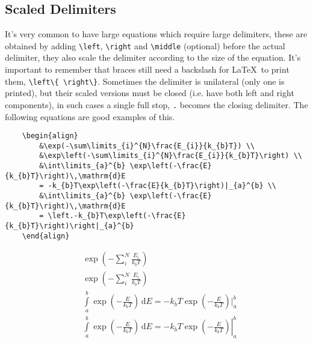 \subsection{Scaled Delimiters}
%
It's very common to have large equations which require large delimiters, these are obtained by adding \verb|\left|, \verb|\right| and \verb|\middle| (optional) before the actual delimiter, they also scale the delimiter according to the size of the equation. It's important to remember that braces still need a backslash for \LaTeX~to print them, \verb|\left\{ \right\}|. Sometimes the delimiter is unilateral (only one is printed), but their scaled versions must be closed (i.e. have both left and right components), in such cases a single full stop, \verb|.| becomes the closing delimiter. The following equations are good examples of this.
\begin{verbatim}
	\begin{align}
	    &\exp(-\sum\limits_{i}^{N}\frac{E_{i}}{k_{b}T}) \\
	    &\exp\left(-\sum\limits_{i}^{N}\frac{E_{i}}{k_{b}T}\right) \\
	    &\int\limits_{a}^{b} \exp\left(-\frac{E}{k_{b}T}\right)\,\mathrm{d}E 
	    = -k_{b}T\exp\left(-\frac{E}{k_{b}T}\right)|_{a}^{b} \\
	    &\int\limits_{a}^{b} \exp\left(-\frac{E}{k_{b}T}\right)\,\mathrm{d}E 
	    = \left.-k_{b}T\exp\left(-\frac{E}{k_{b}T}\right)\right|_{a}^{b}
	\end{align}
\end{verbatim}
\begin{align}
    &\exp(-\sum\limits_{i}^{N}\frac{E_{i}}{k_{b}T}) \\
    &\exp\left(-\sum\limits_{i}^{N}\frac{E_{i}}{k_{b}T}\right) \\
    &\int\limits_{a}^{b} \exp\left(-\frac{E}{k_{b}T}\right)\,\mathrm{d}E 
    = -k_{b}T\exp\left(-\frac{E}{k_{b}T}\right)|_{a}^{b} \\
    &\int\limits_{a}^{b} \exp\left(-\frac{E}{k_{b}T}\right)\,\mathrm{d}E = \left.-k_{b}T\exp\left(-\frac{E}{k_{b}T}\right)\right|_{a}^{b}
\end{align}
%
